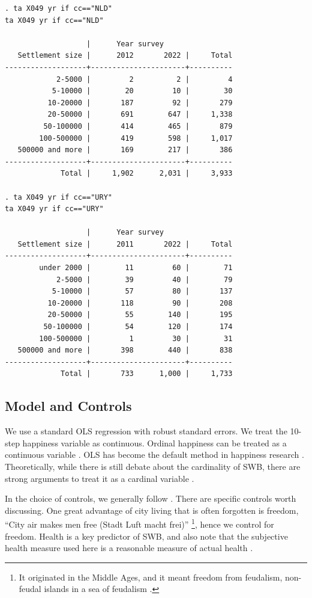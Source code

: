 \documentclass[10pt, letterpaper]{article}
\begin{document}
\begin{spacing}{1.4}
\begin{scriptsize}
\begin{spacing}{.85}
\begin{verbatim}
. ta X049 yr if cc=="NLD"
ta X049 yr if cc=="NLD"

                   |      Year survey
   Settlement size |      2012       2022 |     Total
-------------------+----------------------+----------
            2-5000 |         2          2 |         4 
           5-10000 |        20         10 |        30 
          10-20000 |       187         92 |       279 
          20-50000 |       691        647 |     1,338 
         50-100000 |       414        465 |       879 
        100-500000 |       419        598 |     1,017 
   500000 and more |       169        217 |       386 
-------------------+----------------------+----------
             Total |     1,902      2,031 |     3,933 

. ta X049 yr if cc=="URY"
ta X049 yr if cc=="URY"

                   |      Year survey
   Settlement size |      2011       2022 |     Total
-------------------+----------------------+----------
        under 2000 |        11         60 |        71 
            2-5000 |        39         40 |        79 
           5-10000 |        57         80 |       137 
          10-20000 |       118         90 |       208 
          20-50000 |        55        140 |       195 
         50-100000 |        54        120 |       174 
        100-500000 |         1         30 |        31 
   500000 and more |       398        440 |       838 
-------------------+----------------------+----------
             Total |       733      1,000 |     1,733 
\end{verbatim}
\end{spacing}
\end{scriptsize}

  
\subsection{Model and Controls}

We use a standard OLS regression with robust standard errors.  We treat the 10-step
happiness variable as continuous. Ordinal happiness can be treated as a
continuous variable \citep{carbonell04}.
%
OLS has become the default method in happiness research
\citep{blanchflower11}. Theoretically, while there is still debate about the
cardinality of SWB, there are strong arguments to treat it as a cardinal
variable \citep{ng96,ng97}. 


In the choice of controls, we generally follow \citet{aok21}. There are specific
controls worth discussing.  One great advantage of city living that is often forgotten is freedom,  ``City air makes men free (Stadt Luft macht frei)'' \citet[p. 12]{park84}\footnote{It
   originated in the Middle Ages, and it meant freedom from feudalism,
   non-feudal islands in a sea of feudalism \citep{harvey12}.}, hence we control
 for freedom. Health is a key predictor of SWB, and also note that the subjective health measure used here is a reasonable measure of actual health \citep{subramanian09b}.


\end{spacing}
\end{document}
